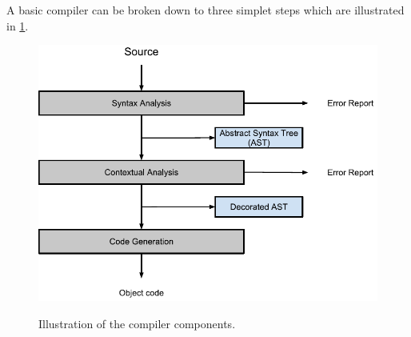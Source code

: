 A basic compiler can be broken down to three simplet steps which are illustrated in \ref{fig:compiler}.

\begin{figure}[H]
\begin{center}
\includegraphics[scale=0.7]{Images/compiler_drawing.png}
\label{fig:compiler}
\caption{Illustration of the compiler components.}
\end{center}
\end{figure}